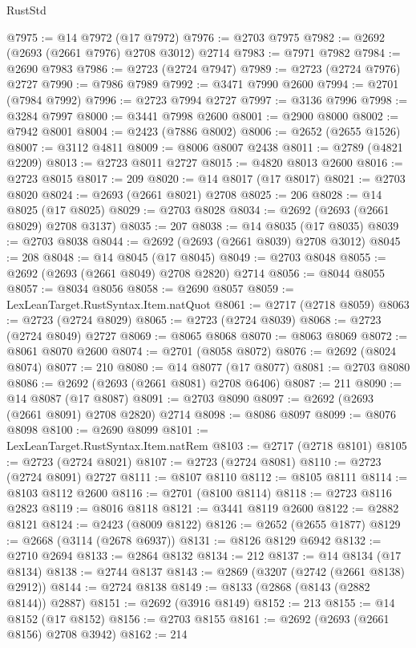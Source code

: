 \begin{lexlean}{RustStd}
\begin{coremodule}
@7975 := @14 @7972 (@17 @7972)
@7976 := @2703 @7975
@7982 := @2692 (@2693 (@2661 @7976) @2708 @3012) @2714
@7983 := @7971 @7982
@7984 := @2690 @7983
@7986 := @2723 (@2724 @7947)
@7989 := @2723 (@2724 @7976) @2727
@7990 := @7986 @7989
@7992 := @3471 @7990 @2600
@7994 := @2701 (@7984 @7992)
@7996 := @2723 @7994 @2727
@7997 := @3136 @7996
@7998 := @3284 @7997
@8000 := @3441 @7998 @2600
@8001 := @2900 @8000
@8002 := @7942 @8001
@8004 := @2423 (@7886 @8002)
@8006 := @2652 (@2655 @1526)
@8007 := @3112 @4811
@8009 := @8006 @8007 @2438
@8011 := @2789 (@4821 @2209)
@8013 := @2723 @8011 @2727
@8015 := @4820 @8013 @2600
@8016 := @2723 @8015
@8017 := 209
@8020 := @14 @8017 (@17 @8017)
@8021 := @2703 @8020
@8024 := @2693 (@2661 @8021) @2708
@8025 := 206
@8028 := @14 @8025 (@17 @8025)
@8029 := @2703 @8028
@8034 := @2692 (@2693 (@2661 @8029) @2708 @3137)
@8035 := 207
@8038 := @14 @8035 (@17 @8035)
@8039 := @2703 @8038
@8044 := @2692 (@2693 (@2661 @8039) @2708 @3012)
@8045 := 208
@8048 := @14 @8045 (@17 @8045)
@8049 := @2703 @8048
@8055 := @2692 (@2693 (@2661 @8049) @2708 @2820) @2714
@8056 := @8044 @8055
@8057 := @8034 @8056
@8058 := @2690 @8057
@8059 := LexLeanTarget.RustSyntax.Item.natQuot
@8061 := @2717 (@2718 @8059)
@8063 := @2723 (@2724 @8029)
@8065 := @2723 (@2724 @8039)
@8068 := @2723 (@2724 @8049) @2727
@8069 := @8065 @8068
@8070 := @8063 @8069
@8072 := @8061 @8070 @2600
@8074 := @2701 (@8058 @8072)
@8076 := @2692 (@8024 @8074)
@8077 := 210
@8080 := @14 @8077 (@17 @8077)
@8081 := @2703 @8080
@8086 := @2692 (@2693 (@2661 @8081) @2708 @6406)
@8087 := 211
@8090 := @14 @8087 (@17 @8087)
@8091 := @2703 @8090
@8097 := @2692 (@2693 (@2661 @8091) @2708 @2820) @2714
@8098 := @8086 @8097
@8099 := @8076 @8098
@8100 := @2690 @8099
@8101 := LexLeanTarget.RustSyntax.Item.natRem
@8103 := @2717 (@2718 @8101)
@8105 := @2723 (@2724 @8021)
@8107 := @2723 (@2724 @8081)
@8110 := @2723 (@2724 @8091) @2727
@8111 := @8107 @8110
@8112 := @8105 @8111
@8114 := @8103 @8112 @2600
@8116 := @2701 (@8100 @8114)
@8118 := @2723 @8116 @2823
@8119 := @8016 @8118
@8121 := @3441 @8119 @2600
@8122 := @2882 @8121
@8124 := @2423 (@8009 @8122)
@8126 := @2652 (@2655 @1877)
@8129 := @2668 (@3114 (@2678 @6937))
@8131 := @8126 @8129 @6942
@8132 := @2710 @2694
@8133 := @2864 @8132
@8134 := 212
@8137 := @14 @8134 (@17 @8134)
@8138 := @2744 @8137
@8143 := @2869 (@3207 (@2742 (@2661 @8138) @2912))
@8144 := @2724 @8138
@8149 := @8133 (@2868 (@8143 (@2882 @8144)) @2887)
@8151 := @2692 (@3916 @8149)
@8152 := 213
@8155 := @14 @8152 (@17 @8152)
@8156 := @2703 @8155
@8161 := @2692 (@2693 (@2661 @8156) @2708 @3942)
@8162 := 214

\end{coremodule}
\end{lexlean}
